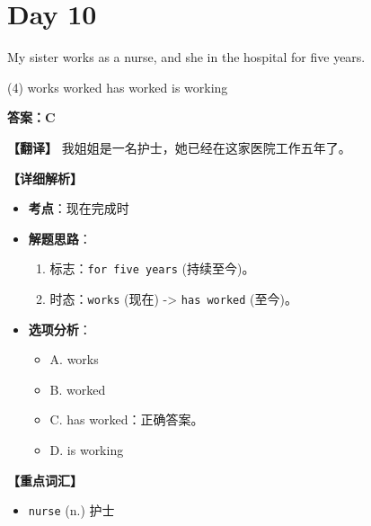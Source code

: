 \documentclass[11pt, a4paper]{article}
\newcommand{\analysis}[4]{
    \begin{solutionbox}
        \textbf{答案：#1}
        
        \textbf{【翻译】} #2
        
        \textbf{【详细解析】}
        #3
        
        \textbf{【重点词汇】}
        #4
    \end{solutionbox}
}
\newcommand{\blank}{\underline{\hspace{1.5cm}}}
\begin{document}
\section*{Day 10}
\begin{questions}
    \item My sister works as a nurse, and she \blank in the hospital for five years.
    \begin{tasks}(4)
        \task works \task worked \task has worked \task is working
    \end{tasks}
    \analysis{C}{我姐姐是一名护士，她已经在这家医院工作五年了。}{
        \begin{itemize}
            \item \textbf{考点}：现在完成时
            \item \textbf{解题思路}：
                \begin{enumerate}
                    \item 标志：\texttt{for five years} (持续至今)。
                    \item 时态：\texttt{works} (现在) -> \texttt{has worked} (至今)。
                \end{enumerate}
            \item \textbf{选项分析}：
                \begin{itemize}
                    \item A. works
                    \item B. worked
                    \item C. has worked：正确答案。
                    \item D. is working
                \end{itemize}
        \end{itemize}
    }{
        \begin{itemize}
            \item \texttt{nurse} (n.) 护士
        \end{itemize}
    }


\end{questions}
\end{document}
